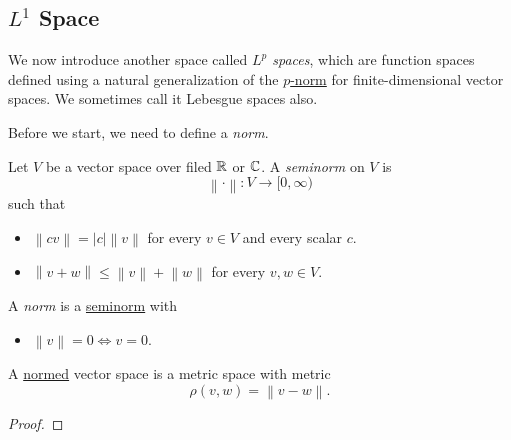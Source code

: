 \subsection{\(L^1\) Space}
We now introduce another space called \emph{\(L^p\) spaces}, which are function spaces defined using a natural generalization of the
\hyperref[eg:p-norm]{\(p\)-norm} for finite-dimensional vector spaces. We sometimes call it Lebesgue spaces also.

Before we start, we need to define a \emph{norm}.
\begin{definition}[Seminorm]\label{def:seminorm}
	Let \(V\) be a vector space over filed \(\mathbb{\MakeUppercase{r}} \) or \(\mathbb{\MakeUppercase{c}} \).
	A \emph{seminorm} on \(V\) is
	\[
		\left\lVert \cdot\right\rVert \colon V\to [0, \infty )
	\]
	such that
	\begin{itemize}
		\item \(\left\lVert c v\right\rVert =\left\vert c \right\vert \left\lVert v\right\rVert \) for every \(v\in V\) and every scalar \(c\).
		\item \(\left\lVert  v+w\right\rVert \leq \left\lVert v\right\rVert +\left\lVert w\right\rVert \) for every \(v, w\in V\).
	\end{itemize}
\end{definition}
\begin{definition}[Norm]\label{def:norm}
	A \emph{norm} is a \hyperref[def:seminorm]{seminorm} with
	\begin{itemize}
		\item \(\left\lVert v\right\rVert = 0 \iff v = 0\).
	\end{itemize}
\end{definition}

\begin{lemma}
	A \hyperref[def:norm]{normed} vector space is a metric space with metric
	\[
		\rho (v, w) = \left\lVert v - w\right\rVert.
	\]
\end{lemma}
\begin{proof}
\end{proof}

